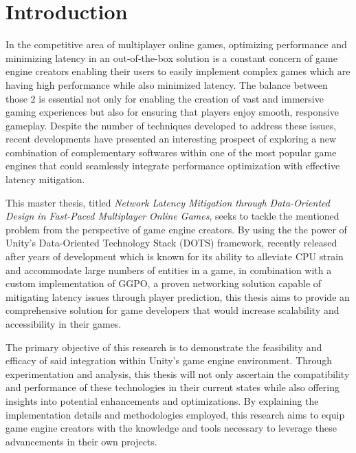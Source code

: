 \chapter{Introduction} 



In the competitive area of multiplayer online games, optimizing performance and minimizing latency in an out-of-the-box solution is a constant concern of game engine creators enabling their users to easily implement complex  games which are having high performance while also minimized latency. The balance between those 2 is essential not only for enabling the creation of vast and immersive gaming experiences but also for ensuring that players enjoy smooth, responsive gameplay. Despite the number of techniques developed to address these issues, recent developments have presented an interesting prospect of exploring a new combination of complementary softwares within one of the most popular game engines that could seamlessly integrate performance optimization with effective latency mitigation.

This master thesis, titled \textit{Network Latency Mitigation through Data-Oriented Design in Fast-Paced Multiplayer Online Games}, seeks to tackle the mentioned problem from the perspective of game engine creators. By using the the power of Unity's Data-Oriented Technology Stack (DOTS) framework, recently released after years of development which is known for its ability to alleviate CPU strain and accommodate large numbers of entities in a game, in combination with a custom implementation of GGPO, a proven networking solution capable of mitigating latency issues through player prediction, this thesis aims to provide an comprehensive solution for game developers that would increase scalability and accessibility in their games.

The primary objective of this research is to demonstrate the feasibility and efficacy of said integration within Unity's game engine environment. Through experimentation and analysis, this thesis will not only ascertain the compatibility and performance of these technologies in their current states while also offering insights into potential enhancements and optimizations. By explaining the implementation details and methodologies employed, this research aims to equip game engine creators with the knowledge and tools necessary to leverage these advancements in their own projects.


